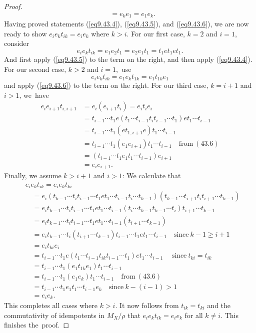 \documentclass{surv-l}
\numberwithin{equation}{section}
\numberwithin{table}{section}
\numberwithin{figure}{section}
\theoremstyle{definition}
\begin{document}
\begin{proof}
\begin{align*}
&=e_{k}e_{1}=e_{1}e_{k}.
\end{align*}
Having proved statements (\ref{eq9.43.4}), (\ref{eq9.43.5}), and
(\ref{eq9.43.6}), we are now ready to show
$e_{i}e_{k}t_{ik}=e_{i}e_{k}$ where $k>i$. For our first case,
$k=2$ and $i=1$, consider
\[
e_{i}e_{k}t_{ik}=e_{1}e_{2}t_{1}=e_{2}e_{1}t_{1}=t_{1}et_{1}et_{1}.
\]
And first apply (\ref{eq9.43.5}) to the term on the right, and
then apply (\ref{eq9.43.4}). For our second case, $k>2$ and
$i=1$,~use
\[
e_{i}e_{k}t_{ik}=e_{1}e_{k}t_{1k}=e_{1}t_{1k}e_{1}
\]
and apply (\ref{eq9.43.6}) to the term on the right. For our third
case, $k=i+1$ and $i>1$, we~have
\begin{align*}
e_{i}e_{i+1}t_{i,i+1}&=e_{i}(e_{i+1}t_{i})=e_{i}t_{i}e_{i} \\
&=t_{i-1}\cdots t_{1}e(t_{1}\cdots t_{i-1}t_{i}t_{i-1}\cdots t_{1})et_{1}\cdots t_{i-1} \\
&=t_{i-1}\cdots t_{1}(et_{1,i+1}e)t_{1}\cdots t_{i-1} \\
&=t_{i-1}\cdots t_{1}(e_{1}e_{i+1})t_{1}\cdots t_{i-1}\quad \mathrm{from}\ (43.6) \\
&=(t_{i-1}\cdots t_{1}e_{1}t_{1}\cdots t_{i-1})e_{i+1} \\
&=e_{i}e_{i+1}.
\end{align*}
Finally, we assume $k>i+1$ and $i>1$: We calculate that
\begin{align*}
&e_{i}e_{k}t_{ik}=e_{i}e_{k}t_{ki} \\
&\quad=e_{i}(t_{k-1}\cdots t_{i}t_{i-1}\cdots t_{1}et_{1}\cdots
t_{i-1}t_{i}\cdots t_{k-1}) (t_{k-1}\cdots t_{i+1}t_{i}t_{i+1}\cdots t_{k-1})\\
&\quad=e_{i}t_{k-1}\cdots t_{i}t_{i-1}\cdots t_{1}et_{1}\cdots t_{i-1}(t_{i}\cdots
t_{k-1}t_{k-1}\cdots t_{i})t_{i+1}\cdots t_{k-1} \\
&\quad=e_{i}t_{k-1}\cdots t_{i}t_{i-1}\cdots t_{1}et_{1}\cdots
t_{i-1}(t_{i+1}\cdots t_{k-1}) \\
&\quad=e_{i}t_{k-1}\cdots t_{i}(t_{i+1}\cdots t_{k-1})t_{i-1}\cdots
t_{1}et_{1}\cdots t_{i-1}\quad \mathrm{since}\ k-1\geq i+1\\
&\quad=e_{i}t_{ki}e_{i} \\
&\quad=t_{i-1}\cdots t_{1}e(t_{1}\cdots t_{i-1}t_{ik}t_{i-1}\cdots
t_{1})et_{1}\cdots t_{i-1}\quad\ \mathrm{since}\ t_{ki}=t_{ik} \\
&\quad=t_{i-1}\cdots t_{1}(e_{1}t_{1k}e_{1})t_{1}\cdots t_{i-1} \\
&\quad=t_{i-1}\cdots t_{1}(e_{1}e_{k})t_{1}\cdots t_{i-1}\quad \mathrm{from}\ (43.6)\\
&\quad=t_{i-1}\cdots t_{1}e_{1}t_{1}\cdots t_{i-1}e_{k}\quad \mathrm{since}\ k-(i-1)>1 \\
&\quad=e_{i}e_{k}.
\end{align*}
This completes all cases where $k>i$. It now follows from
$t_{ik}=t_{ki}$ and the commutativity of idempotents in
$M_{X}/\rho$ that $e_{i}e_{k}t_{ik}=e_{i}e_{k}$ for all $k\neq i$.
This finishes the~proof.
\end{proof}
\end{document}
